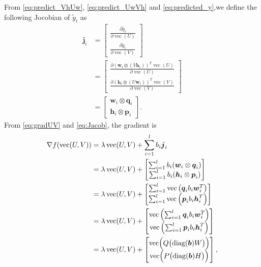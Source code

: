 \documentclass[11pt,twoside]{article}
\newcommand{\bsym}[1]{\ensuremath{\boldsymbol{#1}}}
\newcommand{\bw}{\ensuremath{\bsym{w}}}
\newcommand{\bj}{\ensuremath{\bsym{j}}}
\newcommand{\bp}{\ensuremath{\bsym{p}}}
\newcommand{\bq}{\ensuremath{\bsym{q}}}
\newcommand{\bh}{\ensuremath{\bsym{h}}}
\DeclareMathOperator*{\diag}{diag}
\DeclareMathOperator*{\vectorize}{vec}
\begin{document}
From \eqref{eq:predict_VhUw}, \eqref{eq:predict_UwVh} and \eqref{eq:predicted_y},we define the following Jocobian of $\tilde{y}_i$ as
\begin {align}
\bj_i &= \begin{bmatrix} \frac{\partial \tilde{y}_i}{\partial \vectorize(U)} \\ \frac{\partial \tilde{y}_i}{\partial \vectorize(V)} \end{bmatrix}\nonumber \\
&= \begin{bmatrix} \frac{\partial (\bw_i \otimes (V \bh_i))^T\vectorize(U)}{\partial \vectorize(U)} \\ \frac{\partial (\bh_i \otimes (U \bw_i))^T\vectorize(V)}{\partial \vectorize(V)} \end{bmatrix}\nonumber \\
&= \begin{bmatrix} \bw_i\otimes \bq_i \\ \bh_i\otimes \bp_i \end{bmatrix}
\label{eq:Jacob}.
\end{align}
From \eqref{eq:gradUV} and \eqref{eq:Jacob}, the gradient is
\begin {align}
\nabla {f}(\vectorize(U, V)) 
&= \lambda \vectorize(U,V) + \sum_{i=1}^l b_i \bj_i\nonumber\\
&= \lambda \vectorize(U,V) + \begin{bmatrix} \sum_{i=1}^l b_i (\bw_i\otimes\bq_i) \\ \sum_{i=1}^l b_i (\bh_i\otimes\bp_i)\end{bmatrix}\label{eq:GradU_K1}\\
&= \lambda \vectorize(U,V) + \begin{bmatrix} \sum_{i=1}^l \vectorize\left(\bq_i b_i \bw_i^T \right) \\ \sum_{i=1}^l \vectorize\left(\bp_i b_i \bh_i^T \right)\end{bmatrix}\label{eq:GradU_K2}\\
&= \lambda \vectorize(U,V) + \begin{bmatrix} \vectorize\left( \sum_{i=1}^l \bq_i b_i \bw_i^T \right) \\ \vectorize\left( \sum_{i=1}^l \bp_i b_i \bh_i^T \right)\end{bmatrix}\nonumber\\
&= \lambda \vectorize(U,V) + \begin{bmatrix} \vectorize \Bigl ( Q \bigl(\diag(\bsym{b}) W \bigr)  \Bigr) \\ \vectorize \Bigl ( P \bigl(\diag(\bsym{b}) H \bigr)  \Bigr)\end{bmatrix}
\label{eq:Grad},
\end{align}
\end{document}
